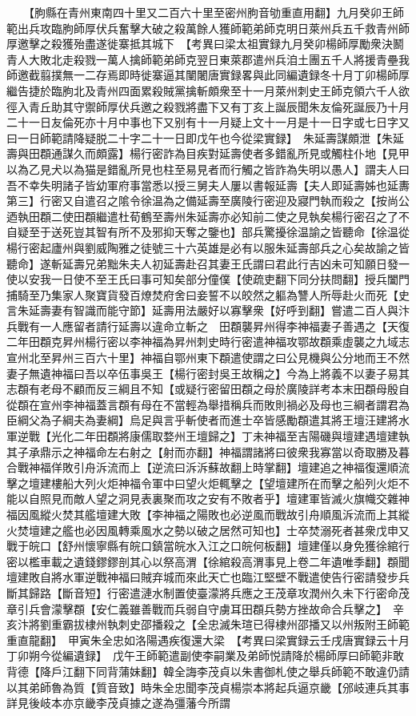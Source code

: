 　　【胊縣在青州東南四十里又二百六十里至密州朐音劬重直用翻】九月癸卯王師範出兵攻臨朐師厚伏兵奮擊大破之殺萬餘人獲師範弟師克明日萊州兵五千救青州師厚邀擊之殺獲殆盡遂徙寨抵其城下　【考異曰梁太祖實録九月癸卯楊師厚勵衆決鬭青人大敗北走殺戮一萬人擒師範弟師克翌日東萊郡遣州兵洎土團五千人將援青壘我師邀截翦撲無一二存焉即時徙寨逼其闉闍唐實録畧與此同編遺録冬十月丁卯楊師厚繼告捷於臨朐北及青州四面累殺賊黨擒斬頗衆至十一月萊州刺史王師克領六千人欲徑入青丘助其守禦師厚伏兵邀之殺戮將盡下又有丁亥上誕辰聞朱友倫死誕辰乃十月二十一日友倫死亦十月中事也下又别有十一月疑上文十一月是十一日字或七日字又曰一日師範請降疑脱二十字二十一日即戊午也今從梁實録】　朱延壽謀頗泄【朱延壽與田頵通謀久而頗露】楊行密詐為目疾對延壽使者多錯亂所見或觸柱仆地【見甲以為乙見犬以為猫是錯亂所見也柱至易見者而行觸之皆詐為失明以愚人】謂夫人曰吾不幸失明諸子皆幼軍府事當悉以授三舅夫人屢以書報延壽【夫人即延壽姊也延夀第三】行密又自遣召之隂令徐温為之備延壽至廣陵行密迎及寢門執而殺之【按尚公迺執田頵二使田頵繼遣杜荀鶴至壽州朱延壽亦必知前二使之見執矣楊行密召之了不自疑至于送死豈其智有所不及邪抑天奪之鑒也】部兵驚擾徐温諭之皆聽命【徐温從楊行密起廬州與劉威陶雅之徒號三十六英雄是必有以服朱延壽部兵之心矣故諭之皆聽命】遂斬延壽兄弟黜朱夫人初延壽赴召其妻王氏謂曰君此行吉凶未可知願日發一使以安我一日使不至王氏曰事可知矣部分僮僕【使疏吏翻下同分扶問翻】授兵闔門捕騎至乃集家人聚寶貨發百燎焚府舍曰妾誓不以皎然之軀為讐人所辱赴火而死【史言朱延壽妻有智識而能守節】延壽用法嚴好以寡擊衆【好呼到翻】嘗遣二百人與汴兵戰有一人應留者請行延壽以違命立斬之　田頵襲昇州得李神福妻子善遇之【天復二年田頵克昇州楊行密以李神福為昇州刺史時行密遣神福攻鄂故頵乘虛襲之九域志宣州北至昇州三百六十里】神福自鄂州東下頵遣使謂之曰公見機與公分地而王不然妻子無遺神福曰吾以卒伍事吳王【楊行密封吳王故稱之】今為上將義不以妻子易其志頵有老母不顧而反三綱且不知【或疑行密留田頵之母於廣陵詳考本末田頵母殷自從頵在宣州李神福蓋言頵有母在不當輕為舉措稱兵而敗則禍必及母也三綱者謂君為臣綱父為子綱夫為妻綱】烏足與言乎斬使者而進士卒皆感勵頵遣其將王壇汪建將水軍逆戰【光化二年田頵將康儒取婺州王壇歸之】丁未神福至吉陽磯與壇建遇壇建執其子承鼎示之神福命左右射之【射而亦翻】神福謂諸將曰彼衆我寡當以奇取勝及暮合戰神福佯敗引舟泝流而上【逆流曰泝泝蘇故翻上時掌翻】壇建追之神福復還順流擊之壇建樓船大列火炬神福令軍中曰望火炬輒擊之【望壇建所在而擊之船列火炬不能以自照見而敵人望之洞見表裏聚而攻之安有不敗者乎】壇建軍皆滅火旗幟交雜神福因風縱火焚其艦壇建大敗【李神福之陽敗也必逆風而戰故引舟順風泝流而上其縱火焚壇建之艦也必因風轉乘風水之勢以破之居然可知也】士卒焚溺死者甚衆戊申又戰于皖口【舒州懷寧縣有皖口鎮當皖水入江之口皖何板翻】壇建僅以身免獲徐綰行密以檻車載之遺錢鏐鏐剖其心以祭高渭【徐綰殺高渭事見上卷二年遺唯季翻】頵聞壇建敗自將水軍逆戰神福曰賊弃城而來此天亡也臨江堅壁不戰遣使告行密請發步兵斷其歸路【斷音短】行密遣漣水制置使臺濛將兵應之王茂章攻潤州久未下行密命茂章引兵會濛擊頵【安仁義雖善戰而兵弱自守虜耳田頵兵勢方挫故命合兵擊之】　辛亥汴將劉重霸拔棣州執刺史邵播殺之【全忠滅朱瑄已得棣州邵播又以州叛附王師範重直龍翻】　甲寅朱全忠如洛陽遇疾復還大梁　【考異曰梁實録云壬戌唐實録云十月丁卯朔今從編遺録】　戊午王師範遣副使李嗣業及弟師悦請降於楊師厚曰師範非敢背德【降戶江翻下同背蒲妹翻】韓全誨李茂貞以朱書御札使之舉兵師範不敢違仍請以其弟師魯為質【質音致】時朱全忠聞李茂貞楊崇本將起兵逼京畿【邠岐連兵其事詳見後岐本亦京畿李茂貞據之遂為彊藩今所謂
